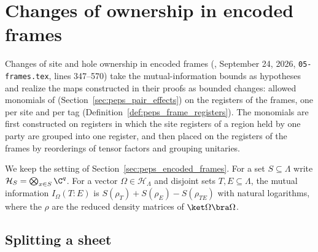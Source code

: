 \section{Changes of ownership in encoded frames}
\label{sec:peps_ownership_changes}
Changes of site and hole ownership in encoded frames
(\cite[Lemmas~6.5 and~6.6]{OpenAI2026PolynomialPEPS}, September 24, 2026,
\texttt{05-frames.tex}, lines 347--570) take the mutual-information bounds as
hypotheses and realize the maps constructed in their proofs as bounded
changes: allowed monomials of \cite[Theorem~5.2]{OpenAI2026PolynomialPEPS}
(Section~\ref{sec:peps_pair_effects}) on the registers of the frames, one per
site and per tag (Definition~\ref{def:peps_frame_registers}). The monomials are
first constructed on registers in which the site registers of a region held by
one party are grouped into one register, and then placed on the registers of
the frames by reorderings of tensor factors and grouping unitaries.

We keep the setting of Section~\ref{sec:peps_encoded_frames}. For a set
$S\subseteq\Lambda$ write $\mathcal H_S=\bigotimes_{x\in S}\C^q$. For a vector
$\Omega\in\mathcal H_\Lambda$ and disjoint sets $T,E\subseteq\Lambda$, the
mutual information $I_\Omega(T:E)$ is
$S(\rho_T)+S(\rho_E)-S(\rho_{TE})$ with natural logarithms, where the $\rho$
are the reduced density matrices of $\ket\Omega\bra\Omega$.

\subsection{Splitting a sheet}

